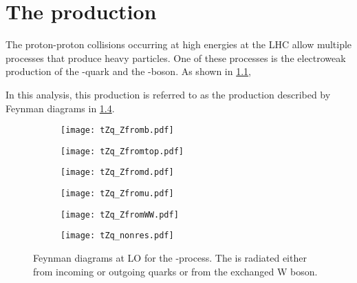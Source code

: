 
\chapter{The \tZqsec production}
\label{sec:tZq}

The proton-proton collisions occurring at high energies at the LHC allow 
multiple processes that produce heavy particles. One of these
processes is the electroweak production of the \Ptop-quark and the 
\PZ-boson. As shown in \cref{fig:tZqfeyna}, 

In this analysis, this production
is referred to as the \tZq production described by Feynman diagrams in 
\cref{fig:tZqfeyn}. 

\begin{figure}[htbp]
    \centering
    \begin{subfigure}{0.35\figwidth}
      \centering
         \texttt{[image: tZq\_Zfromb.pdf]}
         \label{fig:tZqfeyna}
    \end{subfigure}
    \qquad
    \begin{subfigure}{0.35\figwidth}
      \centering
      \texttt{[image: tZq\_Zfromtop.pdf]}
      \label{fig:tZqfeyn(b)}
    \end{subfigure}
    \begin{subfigure}{0.35\figwidth}
      \centering
      \texttt{[image: tZq\_Zfromd.pdf]}
      \label{fig:tZqfeyn(c)}
    \end{subfigure}
  
  
  \medskip
  
  
  \begin{subfigure}{0.35\figwidth}
      \centering
      \texttt{[image: tZq\_Zfromu.pdf]}
    \end{subfigure}
    \begin{subfigure}{0.35\figwidth}
      \centering
      \texttt{[image: tZq\_ZfromWW.pdf]}
    \end{subfigure}
    \begin{subfigure}{0.35\figwidth}
        \centering
        \texttt{[image: tZq\_nonres.pdf]}
      \end{subfigure}
  
  \caption[Feynman diagrams at LO for the \tZq-process]{Feynman diagrams at 
  LO for the \tZq-process. The \PZ is radiated either from incoming or 
  outgoing quarks or from the exchanged W boson. }
  \label{fig:tZqfeyn}
  \end{figure}

